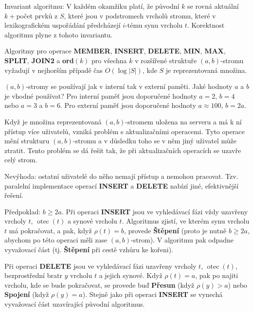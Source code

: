 \documentclass[a4paper,12pt]{article}
\DeclareMathOperator*{\otec}{otec}
\begin{document}
Invariant algoritmu: V každém okamžiku platí, 
že původní $k$ se rovná aktuální $k+$počet prvků z 
$S$, které jsou v podstromech vrcholů stromu, které v 
lexikografickém uspořádání předcházejí $i$-tému synu 
vrcholu $t$. Korektnost algoritmu plyne z tohoto 
invariantu.

Algoritmy pro operace {\bf MEMBER}, {\bf INSERT}, 
{\bf DE\-LETE}, {\bf MIN}, {\bf MAX}, {\bf SPLIT}, {\bf JOIN2} a {\bf ord$
(k)$} pro všechna $k$ v 
rozšířené struktuře $(a,b)$-stromu vy\-ža\-dují v 
nejhorším pří\-pa\-dě čas $O(\log|S|)$, kde $S$ je reprezentovaná 
množina.  
\endproclaim

$(a,b)$-stromy se používají jak v interní tak v 
externí paměti. Jaké hodnoty $a$ a $b$ je vhodné 
používat?\newline 
Pro interní paměť jsou doporučené hodnoty $a=2$, $
b=4$ 
nebo $a=3$ a $b=6$.\newline 
Pro externí paměť jsou doporučené hodnoty $a\approx 
100$, 
$b=2a$.

Když je množina reprezentovaná $(a,b)$-stromem 
uložena na serveru a má k ní přístup více 
uživatelů, vzniká problém s aktualizačními 
operacemi. Tyto operace mění strukturu $(a,b)$-stromu a 
v důsledku toho se v něm jiný uživatel 
může ztratit. Tento problém se dá  
řešit tak, že při aktu\-alizačních operacích 
se uzavře celý strom.

 

Nevýhoda: ostatní uživatelé  
do něho nemají přístup a nemohou pracovat. Tzv. paralelní 
implementace operací {\bf INSERT} a {\bf DELETE} nabízí jiné, 
efektivnější řešení.

Předpoklad: $b\ge 2a$. \newline 
Při operaci {\bf INSERT} jsou ve vyhledávací fázi vždy 
uzavřeny vrcholy $t$, $\otec(t)$ a synové vrcholu $t$. 
Algoritmus zjistí, ve kterém synu vrcholu $t$ má 
pokračovat, a pak, když $\rho (t)=b$, provede {\bf Štěpení }
(proto je nutně $b\ge 2a$, abychom po této ope\-raci měli 
zase $(a,b)$-strom). V algoritmu pak odpadne vyva\-žo\-vací 
část (tj. {\bf Štěpení} při cestě vzhůru ke 
kořeni).

Při operaci {\bf DELETE} jsou ve vyhledávací fázi uzavřeny 
vrcholy $t$, $\otec(t)$, bezprostřední bratr $y$ vrcholu $
t$ a 
jejich synové. 
Když $\rho (t)=a$, pak po najiti vrcholu, kde se bude 
pokračovat, se provede buď {\bf Přesun} (když $\rho (
y)>a$) nebo 
{\bf Spojení} (když $\rho (y)=a$). Stejně jako při operaci 
{\bf INSERT} se vynechá vyva\-žo\-vací část 
uzavírající původní algoritmus.
\end{document}
